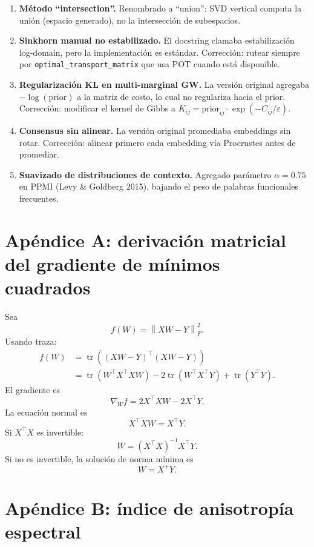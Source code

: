 \documentclass[11pt,a4paper]{article}
\DeclareMathOperator{\tr}{tr}
\newcommand{\1}{\mathbf{1}}
\newcommand{\norm}[1]{\left\lVert #1 \right\rVert}
\numberwithin{equation}{section}
\begin{document}
\begin{enumerate}[label=(\roman*)]
    \item \textbf{Método ``intersection''.} Renombrado a ``union'': SVD vertical computa la unión (espacio generado), no la intersección de subespacios.

    \item \textbf{Sinkhorn manual no estabilizado.} El docstring clamaba estabilización log-domain, pero la implementación es estándar. Corrección: rutear siempre por \texttt{optimal\_transport\_matrix} que usa POT cuando está disponible.

    \item \textbf{Regularización KL en multi-marginal GW.} La versión original agregaba $-\log(\text{prior})$ a la matriz de costo, lo cual no regulariza hacia el prior. Corrección: modificar el kernel de Gibbs a $K_{ij} = \text{prior}_{ij} \cdot \exp(-C_{ij}/\varepsilon)$.

    \item \textbf{Consensus sin alinear.} La versión original promediaba embeddings sin rotar. Corrección: alinear primero cada embedding vía Procrustes antes de promediar.

    \item \textbf{Suavizado de distribuciones de contexto.} Agregado parámetro $\alpha=0.75$ en PPMI (Levy \& Goldberg 2015), bajando el peso de palabras funcionales frecuentes.
\end{enumerate}

\appendix
\section{Apéndice A: derivación matricial del gradiente de mínimos cuadrados}

Sea
\[
    f(W)=\norm{XW-Y}_F^2.
\]
Usando traza:
\begin{align}
    f(W)
    &=
    \tr((XW-Y)^\top(XW-Y))\\
    &=
    \tr(W^\top X^\top XW)
    -2\tr(W^\top X^\top Y)
    +
    \tr(Y^\top Y).
\end{align}
El gradiente es
\[
    \nabla_W f
    =
    2X^\top XW-2X^\top Y.
\]
La ecuación normal es
\[
    X^\top XW=X^\top Y.
\]
Si \(X^\top X\) es invertible:
\[
    W=(X^\top X)^{-1}X^\top Y.
\]
Si no es invertible, la solución de norma mínima es
\[
    W=X^+Y.
\]

\section{Apéndice B: índice de anisotropía espectral}
\end{document}
